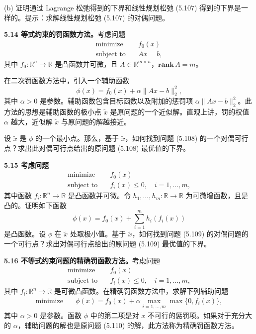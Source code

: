 \documentclass[UTF8,12pt,a4paper,fontset=fandol]{ctexart}
\begin{document}
(b) 证明通过 Lagrange 松弛得到的下界和线性规划松弛 (5.107) 得到的下界是一样的。提示：求解线性规划松弛 (5.107) 的对偶问题。

\noindent\textbf{5.14 等式约束的罚函数方法。}\quad 考虑问题
\begin{equation}
\begin{aligned}
\text{minimize}\quad & f_0(x)\\
\text{subject to}\quad & Ax=b,
\end{aligned}
\tag{5.108}
\end{equation}
其中 $f_0:\mathbb{R}^n\to\mathbb{R}$ 是凸函数并可微，且 $A\in\mathbb{R}^{m\times n}$，$\mathbf{rank}\,A=m$。

在二次罚函数方法中，引入一个辅助函数
\[
\phi(x)=f_0(x)+\alpha\|Ax-b\|_2^2,
\]
其中 $\alpha>0$ 是参数。辅助函数包含目标函数以及附加的惩罚项 $\alpha\|Ax-b\|_2^2$。此方法的思想是辅助函数的极小点 $\tilde{x}$ 是原问题的一个近似解。直观上讲，罚的权值 $\alpha$ 越大，近似解 $\tilde{x}$ 与原问题的解越接近。

设 $\tilde{x}$ 是 $\phi$ 的一个最小点。那么，基于 $\tilde{x}$，如何找到问题 (5.108) 的一个对偶可行点？求出此对偶可行点给出的原问题 (5.108) 最优值的下界。

\noindent\textbf{5.15 考虑问题}
\begin{equation}
\begin{aligned}
\text{minimize}\quad & f_0(x)\\
\text{subject to}\quad & f_i(x)\leq 0,\quad i=1,\ldots,m,
\end{aligned}
\tag{5.109}
\end{equation}
其中函数 $f_i:\mathbb{R}^n\to\mathbb{R}$ 是凸函数并可微。令 $h_1,\ldots,h_m:\mathbb{R}\to\mathbb{R}$ 为可微增函数，且是凸的。证明如下函数
\[
\phi(x)=f_0(x)+\sum_{i=1}^m h_i(f_i(x))
\]
是凸函数。设 $\phi$ 在 $\tilde{x}$ 处取极小值。基于 $\tilde{x}$，如何找到问题 (5.109) 的对偶问题的一个可行点？求出对偶可行点给出的原问题 (5.109) 最优值的下界。

\noindent\textbf{5.16 不等式约束问题的精确罚函数方法。}\quad 考虑问题
\begin{equation}
\begin{aligned}
\text{minimize}\quad & f_0(x)\\
\text{subject to}\quad & f_i(x)\leq 0,\quad i=1,\ldots,m,
\end{aligned}
\tag{5.110}
\end{equation}
其中 $f_i:\mathbb{R}^n\to\mathbb{R}$ 是可微凸函数。在精确罚函数方法中，求解下列辅助问题
\begin{equation}
\begin{aligned}
\text{minimize}\quad & \phi(x)=f_0(x)+\alpha\max_{i=1,\ldots,m}\max\{0,f_i(x)\},
\end{aligned}
\tag{5.111}
\end{equation}
其中 $\alpha>0$ 是参数。函数 $\phi$ 中的第二项是对 $x$ 不可行的惩罚项。如果对于充分大的 $\alpha$，辅助问题的解也是原问题 (5.110) 的解，此方法称为精确罚函数方法。
\end{document}

